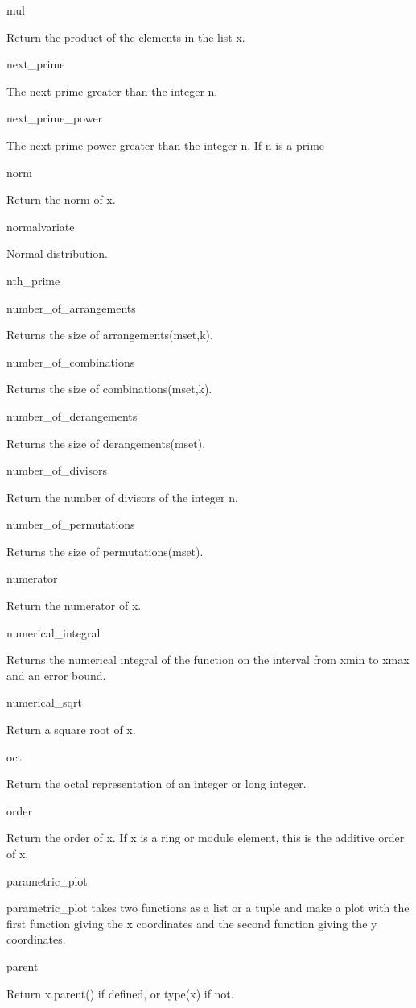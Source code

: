 \documentclass[12pt,oneside]{book}
\begin{document}
mul

Return the product of the elements in the list x.

next\_prime

The next prime greater than the integer n.

next\_prime\_power

The next prime power greater than the integer n. If n is a prime

norm

Return the norm of x.

normalvariate

Normal distribution.

nth\_prime


number\_of\_arrangements

Returns the size of arrangements(mset,k).

number\_of\_combinations

Returns the size of combinations(mset,k).

number\_of\_derangements

Returns the size of derangements(mset).

number\_of\_divisors

Return the number of divisors of the integer n.

number\_of\_permutations

Returns the size of permutations(mset).

numerator

Return the numerator of x.

numerical\_integral

Returns the numerical integral of the function on the interval from xmin to xmax and an error bound.

numerical\_sqrt

Return a square root of x.

oct

Return the octal representation of an integer or long integer.

order

Return the order of x. If x is a ring or module element, this is the additive order of x.

parametric\_plot

parametric\_plot takes two functions as a list or a tuple and make a plot with the first function giving the x coordinates and the second function giving the y coordinates.

parent

Return x.parent() if defined, or type(x) if not.
\end{document}
